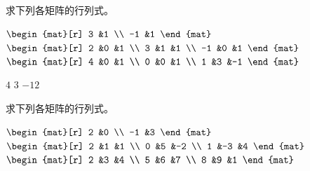 \begin{exercises}
  \recommended \item 
     求下列各矩阵的行列式。
     \begin{exparts*}
       \partsitem \(
            \begin{mat}[r]
                3    &1   \\
               -1    &1
            \end{mat}    \)
       \partsitem \(
            \begin{mat}[r]
                2    &0   &1  \\
                3    &1   &1 \\
               -1    &0   &1
            \end{mat}    \)
       \partsitem \(
            \begin{mat}[r]
                4    &0   &1  \\
                0    &0   &1 \\
                1    &3   &-1
            \end{mat}    \)
     \end{exparts*}
     \begin{answer}
       \begin{exparts*}
         \partsitem \( 4 \)
         \partsitem \( 3 \)
         \partsitem \( -12 \)
       \end{exparts*}  
     \end{answer}
  \item 
     求下列各矩阵的行列式。
     \begin{exparts*}
        \partsitem \( \begin{mat}[r]
                    2  &0  \\
                   -1  &3
                 \end{mat} \)
        \partsitem \( \begin{mat}[r]
                    2  &1  &1  \\
                    0  &5  &-2 \\
                    1  &-3 &4
                 \end{mat} \)
        \partsitem \( \begin{mat}[r]
                    2  &3  &4  \\
                    5  &6  &7  \\
                    8  &9  &1
                 \end{mat} \)
     \end{exparts*}

\end{exercises}
